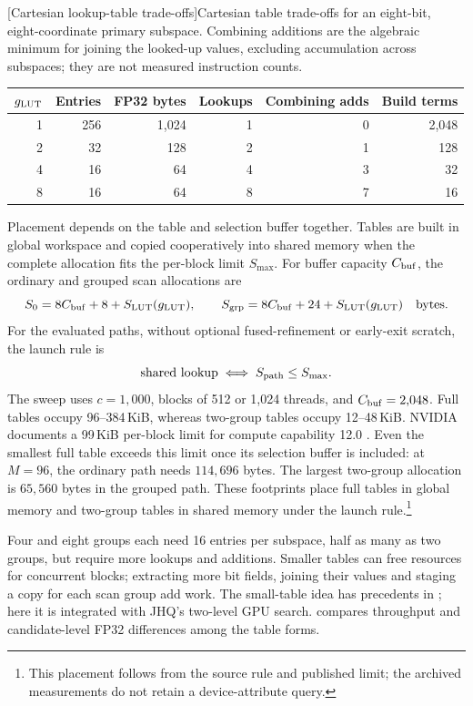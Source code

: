 \par\medskip\noindent\begin{minipage}{\linewidth}
\captionsetup{hypcap=false}
\centering
{}[Cartesian lookup-table trade-offs]{Cartesian table trade-offs for an eight-bit, eight-coordinate
primary subspace. Combining additions are the algebraic minimum for
joining the looked-up values, excluding accumulation across subspaces;
they are not measured instruction counts.}
\label{tab:5-lut-resources}
\small
\begin{tabular}{@{}rrrrrr@{}}
\toprule
$g_{\mathrm{LUT}}$ & Entries & FP32 bytes & Lookups & Combining adds & Build terms \\
\midrule
1 & 256 & 1,024 & 1 & 0 & 2,048 \\
2 & 32 & 128 & 2 & 1 & 128 \\
4 & 16 & 64 & 4 & 3 & 32 \\
8 & 16 & 64 & 8 & 7 & 16 \\
\bottomrule
\end{tabular}
\end{minipage}\par\medskip
Placement depends on the table and selection buffer together. Tables
are built in global workspace and copied cooperatively into shared
memory when the complete allocation fits the per-block limit
$S_{\max}$. For buffer capacity $C_{\rm buf}$, the ordinary and grouped
scan allocations are
\begin{equation}
 S_0=8C_{\rm buf}+8+S_{\rm LUT}(g_{\mathrm{LUT}}),\qquad
 S_{\rm grp}=8C_{\rm buf}+24+S_{\rm LUT}(g_{\mathrm{LUT}})
 \quad\text{bytes}.
 \label{eq:5-shared-footprint}
\end{equation}
For the evaluated paths, without optional fused-refinement or early-exit
scratch, the launch rule is
\[
 \text{shared lookup}\iff S_{\rm path}\leq S_{\max}.
\]
The sweep uses $c=1{,}000$, blocks of 512 or 1,024 threads, and
$C_{\rm buf}=2{,}048$. Full tables occupy 96--384\,KiB, whereas two-group
tables occupy 12--48\,KiB. NVIDIA documents a 99\,KiB per-block limit
for compute capability 12.0 \cite{blackwell_tuning}. Even the smallest
full table exceeds this limit once its selection buffer is included:
at $M=96$, the ordinary path needs $114{,}696$ bytes. The largest
two-group allocation is $65{,}560$ bytes in the grouped path. These
footprints place full tables in global memory and two-group tables in
shared memory under the launch rule.\footnote{This placement follows
from the source rule and published limit; the archived measurements
do not retain a device-attribute query.}

Four and eight groups each need 16 entries per subspace, half as many
as two groups, but require more lookups and additions. Smaller tables
can free resources for concurrent blocks; extracting more bit fields,
joining their values and staging a copy for each scan group add work.
The small-table idea has precedents in \cite{fastscan,quickeradc,ivfrabitq};
here it is integrated with JHQ's two-level GPU search. 
compares throughput and candidate-level FP32 differences among the
table forms.
